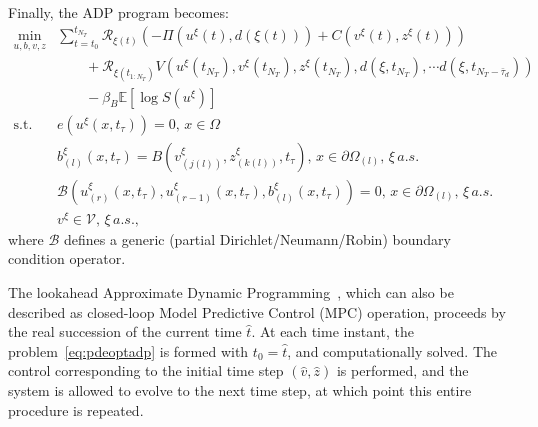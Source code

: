 \documentclass{article}
\newcommand{\1}{\mathds{1}}          %
\theoremstyle{definition}
\begin{document}
\begin{sloppypar}
Finally, the ADP program becomes:
\begin{equation}\label{eq:pdeoptadp}
    \begin{array}{rl}
\min\limits_{u,b,v,z} & \sum_{t=t_0}^{t_{N_T}} \mathcal{R}_{\xi(t)}\left(-\Pi(u^{\xi}(t),d(\xi(t)))+C(v^{\xi}(t),z^{\xi}(t))\right) \\ & \qquad +\mathcal{R}_{\xi(t_{1:N_{T}})}V\left(u^{\xi}(t_{N_T}), v^{\xi}(t_{N_T}),z^{\xi}(t_{N_T}),d(\xi,t_{N_T}),\cdots d(\xi,t_{N_T-\bar{\tau}_d})\right)\\
& \qquad - \beta_B \mathbb{E}\left[\log S(u^{\xi})\right]
\\
\text{s.t. } & e(u^{\xi}(x,t_{\tau})) = 0,\,x\in\Omega \\ 
&  b^{\xi}_{(l)}(x,t_{\tau})=B(v^{\xi}_{(j(l))},z^{\xi}_{(k(l))},t_{\tau}) ,\, x\in\partial \Omega_{(l)},\,\xi\,a.s.\\ 
& \mathcal{B}\left(u^{\xi}_{(r)}(x,t_{\tau}),u^{\xi}_{(r-1)}(x,t_{\tau}),b^{\xi}_{(l)}(x,t_{\tau})\right)=0,\,x\in \partial \Omega_{(l)},\,\xi\,a.s.  \\
& v^{\xi}\in\mathcal{V},\,\xi\,a.s.,
    \end{array}
\end{equation}
where $\mathcal{B}$ defines a generic (partial Dirichlet/Neumann/Robin) boundary condition operator.

The lookahead Approximate Dynamic Programming~\cite{powell2007approximate}, which can also be described as closed-loop Model Predictive Control (MPC) operation, proceeds by the real succession of the current time $\hat{t}$. At each time instant, the problem~\eqref{eq:pdeoptadp} is formed with $t_0=\hat{t}$, and computationally solved. The control corresponding to the initial time step $(\hat{v},\hat{z})$ is performed, and the system is allowed to evolve to the next time step, at which point this entire procedure is repeated. 




\end{sloppypar}
\end{document}
